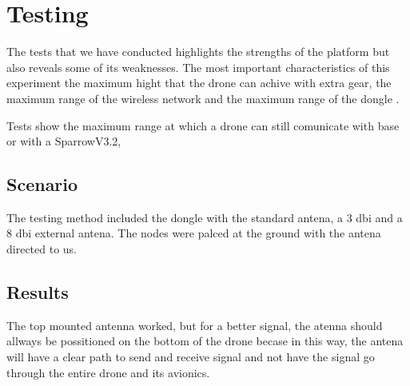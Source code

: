\normalfont\normalsize
\chapter{Testing}

The tests that we have conducted highlights the strengths of the platform but also reveals some of its weaknesses.
The most important characteristics of this experiment the maximum hight that the drone  can achive with extra gear, the maximum range of the wireless network and the maximum range of the dongle .

Tests show the maximum range at which a drone can still comunicate with base or with a SparrowV3.2,


\section{Scenario}

The testing method included the dongle with the standard antena, a 3 dbi and a 8 dbi external antena.
The nodes were palced at the ground with the antena directed to us.

\section{Results}

The top mounted antenna worked, but for a better signal, the atenna should allways be possitioned on the bottom of the drone becase in this way, the antena will have a clear path to send and receive signal and not have the signal go through the entire drone and its avionics.



\clearpage
 
